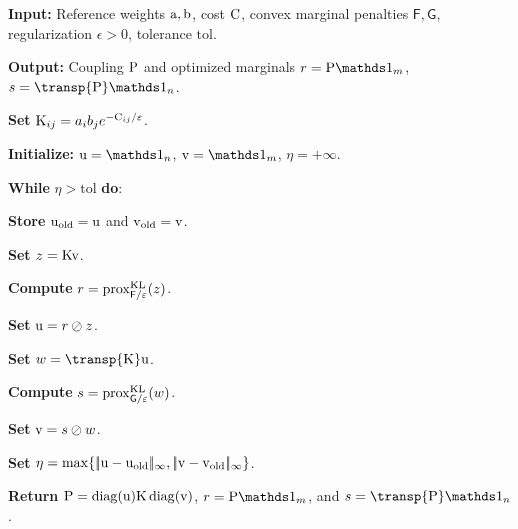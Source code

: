\begin{alg}\label{alg-generalized-sinkhorn-marginal-penalties}
\textbf{Input:} Reference weights $\a,\b$, cost $\C$, convex marginal penalties $\mathsf F,\mathsf G$, regularization $\epsilon>0$, tolerance $\mathrm{tol}$.

\textbf{Output:} Coupling $\P$ and optimized marginals $r=\P\ones_m$, $s=\transp{\P}\ones_n$.

\textbf{Set} $\K_{ij}=a_i b_j e^{-\C_{ij}/\epsilon}$.

\textbf{Initialize:} $\uD=\ones_n$, $\vD=\ones_m$, $\eta=+\infty$.

\textbf{While} $\eta>\mathrm{tol}$ \textbf{do}:
\begin{algblock}
\textbf{Store} $\uD_{\mathrm{old}}=\uD$ and $\vD_{\mathrm{old}}=\vD$.

\textbf{Set} $z=\K\vD$.

\textbf{Compute} $r=\prox_{\mathsf F/\epsilon}^{\KLD}(z)$.

\textbf{Set} $\uD=r\oslash z$.

\textbf{Set} $w=\transp{\K}\uD$.

\textbf{Compute} $s=\prox_{\mathsf G/\epsilon}^{\KLD}(w)$.

\textbf{Set} $\vD=s\oslash w$.

\textbf{Set} $\eta=\max\{\norm{\uD-\uD_{\mathrm{old}}}_\infty,\norm{\vD-\vD_{\mathrm{old}}}_\infty\}$.
\end{algblock}
\algreturnskip
\textbf{Return} $\P=\diag(\uD)\K\diag(\vD)$, $r=\P\ones_m$, and $s=\transp{\P}\ones_n$.
\end{alg}


